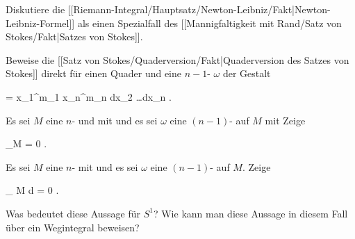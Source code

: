 \setcounter{section}{23}


{}
{

Diskutiere die
[[Riemann-Integral/Hauptsatz/Newton-Leibniz/Fakt|Newton-Leibniz-Formel]]
als einen Spezialfall des
[[Mannigfaltigkeit mit Rand/Satz von Stokes/Fakt|Satzes von Stokes]].

}
{} {}

{}
{

Beweise die
[[Satz von Stokes/Quaderversion/Fakt|Quaderversion des Satzes von Stokes]]
direkt für einen Quader
\mathl{[a_1,b_1] \times \cdots \times [a_n,b_n]}{} und eine
$n-1$-
$\omega$ der Gestalt

\mavergleichskettedisp
{\vergleichskette
{ \omega
}
{ =} { x_1^{m_1 } \cdots x_n^{m_n }  dx_2 \wedge \ldots \wedge dx_n
}
{ } {
}
{ } {
}
{ } {
}
}
{}{}{.}

}
{} {}

{}
{

Es sei $M$ eine
$n$-
und mit
und es sei $\omega$ eine
  $(n-1)$-
auf $M$ mit
Zeige

\mavergleichskettedisp
{\vergleichskette
{ \int_{\partial M} \omega
}
{ =} { 0
}
{ } {
}
{ } {
}
{ } {
}
}
{}{}{.}

}
{} {}

{}
{

Es sei $M$ eine
$n$-
 {} {}
mit
und es sei $\omega$ eine
$(n-1)$-
auf $M$. Zeige

\mavergleichskettedisp
{\vergleichskette
{
\int_{ M  }  d\omega
}
{ =} { 0
}
{ } {
}
{ } {
}
{ } {
}
}
{}{}{.}

}
{Was bedeutet diese Aussage für $S^1$? Wie kann man diese Aussage in diesem Fall über ein Wegintegral beweisen?} {}

